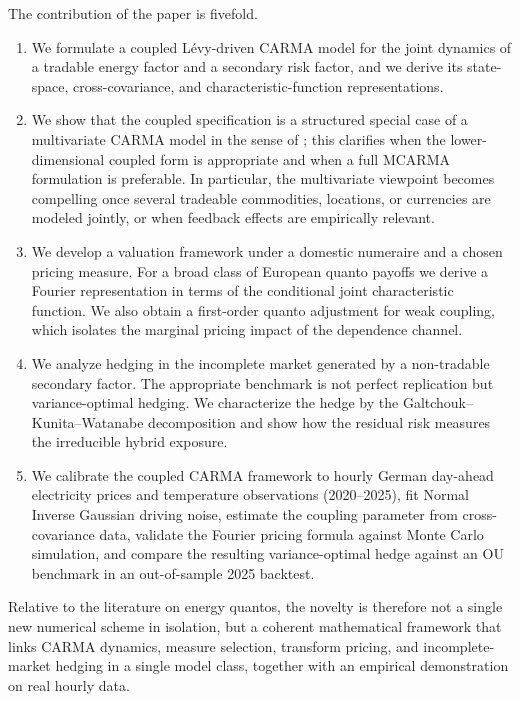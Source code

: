 \documentclass[10pt,reqno]{amsart}
\newcommand{\1}{\mathbbm{1}}
\begin{document}
The contribution of the paper is fivefold.
\begin{enumerate}[label=(\roman*)]
  \item We formulate a coupled Lévy-driven CARMA model for the joint dynamics of
    a tradable energy factor and a secondary risk factor, and we derive its
    state-space, cross-covariance, and characteristic-function representations.
  \item We show that the coupled specification is a structured special case of a
    multivariate CARMA model in the sense of \citet{Mar07}; this clarifies when
    the lower-dimensional coupled form is appropriate and when a full MCARMA
    formulation is preferable. In particular, the multivariate viewpoint becomes
    compelling once several tradeable commodities, locations, or currencies are
    modeled jointly, or when feedback effects are empirically relevant.
  \item We develop a valuation framework under a domestic numeraire and a chosen
    pricing measure. For a broad class of European quanto payoffs we derive a
    Fourier representation in terms of the conditional joint characteristic
    function. We also obtain a first-order quanto adjustment for weak coupling,
    which isolates the marginal pricing impact of the dependence channel.
  \item We analyze hedging in the incomplete market generated by a non-tradable
    secondary factor. The appropriate benchmark is not perfect replication but
    variance-optimal hedging. We characterize the hedge by the
    Galtchouk--Kunita--Watanabe decomposition and show how the residual risk
    measures the irreducible hybrid exposure.
  \item We calibrate the coupled CARMA framework to hourly German day-ahead
    electricity prices and temperature observations (2020--2025), fit
    Normal Inverse Gaussian driving noise, estimate the coupling parameter from
    cross-covariance data, validate the Fourier pricing formula against Monte
    Carlo simulation, and compare the resulting variance-optimal hedge against
    an OU benchmark in an out-of-sample 2025 backtest.
\end{enumerate}

Relative to the literature on energy quantos, the novelty is therefore not a
single new numerical scheme in isolation, but a coherent mathematical framework
that links CARMA dynamics, measure selection, transform pricing, and
incomplete-market hedging in a single model class, together with an empirical
demonstration on real hourly data.
\end{document}
